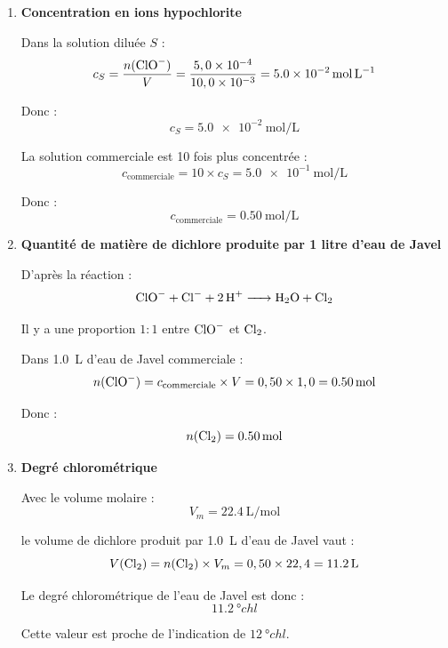 \documentclass[a4paper,fontsize=11pt,fleqn]{scrartcl}
\begin{document}
\begin{enumerate}
    \item \textbf{Concentration en ions hypochlorite}

    Dans la solution diluée $S$ :
    \[
    c_S = \frac{n(\ce{ClO^-})}{V}
    = \frac{5,0\times10^{-4}}{10,0\times10^{-3}}
    = \SI{5,0e-2}{\mole\per\liter}
    \]

    Donc :
    \[
    c_S = \SI{5,0e-2}{\mole\per\liter}
    \]

    La solution commerciale est 10 fois plus concentrée :
    \[
    c_{\text{commerciale}} = 10 \times c_S = \SI{5,0e-1}{\mole\per\liter}
    \]

    Donc :
    \[
    c_{\text{commerciale}} = \SI{0,50}{\mole\per\liter}
    \]

    \item \textbf{Quantité de matière de dichlore produite par 1 litre d'eau de Javel}

    D'après la réaction :
    \[
    \ce{ClO^- + Cl^- + 2H^+ -> H2O + Cl2}
    \]

    Il y a une proportion \(1:1\) entre \(\ce{ClO^-}\) et \(\ce{Cl2}\).

    Dans \SI{1,0}{L} d'eau de Javel commerciale :
    \[
    n(\ce{ClO^-}) = c_{\text{commerciale}} \times V = 0,50 \times 1,0 = \SI{0,50}{mol}
    \]

    Donc :
    \[
    n(\ce{Cl2}) = \SI{0,50}{mol}
    \]

    \item \textbf{Degré chlorométrique}

    Avec le volume molaire :
    \[
    V_m = \SI{22,4}{\liter\per\mole}
    \]

    le volume de dichlore produit par \SI{1,0}{L} d'eau de Javel vaut :
    \[
    V(\ce{Cl2}) = n(\ce{Cl2}) \times V_m
    = 0,50 \times 22,4
    = \SI{11,2}{L}
    \]

    Le degré chlorométrique de l'eau de Javel est donc :
    \[
    \boxed{\SI{11,2}{\degree chl}}
    \]

    Cette valeur est proche de l'indication de \(\SI{12}{\degree chl}\).
\end{enumerate}
\end{document}
